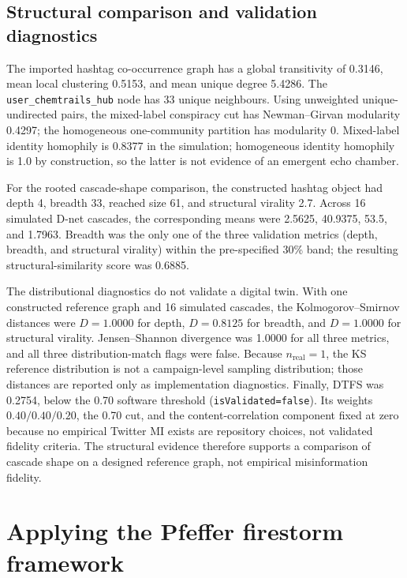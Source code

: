 \subsection{Structural comparison and validation diagnostics}

The imported hashtag co-occurrence graph has a global transitivity of 0.3146, mean local clustering
0.5153, and mean unique degree 5.4286.  The
\texttt{user\_chemtrails\_hub} node has 33 unique neighbours.  Using
unweighted unique-undirected pairs, the mixed-label conspiracy cut has
Newman--Girvan modularity 0.4297; the homogeneous one-community partition
has modularity 0.  Mixed-label identity homophily is 0.8377
in the simulation; homogeneous identity homophily is 1.0 by construction,
so the latter is not evidence of an emergent echo chamber.

For the rooted cascade-shape comparison, the constructed hashtag object had depth
4, breadth 33, reached size 61, and structural virality 2.7.  Across 16
simulated D-net cascades, the corresponding means were 2.5625, 40.9375,
53.5, and 1.7963.  Breadth was the only one of the three validation metrics
(depth, breadth, and structural virality) within the pre-specified
30\% band; the resulting structural-similarity score was 0.6885.

The distributional diagnostics do not validate a digital twin.
With one constructed reference graph and 16 simulated cascades, the
Kolmogorov--Smirnov distances were \(D=1.0000\) for depth,
\(D=0.8125\) for breadth, and \(D=1.0000\) for structural virality.
Jensen--Shannon divergence was 1.0000 for all three metrics, and all three
distribution-match flags were false. Because \(n_{\mathrm{real}}=1\), the KS
reference distribution is not a campaign-level sampling distribution; those
distances are reported only as implementation diagnostics. Finally, DTFS
was 0.2754, below the 0.70 software threshold
(\texttt{isValidated=false}). Its weights \(0.40/0.40/0.20\), the 0.70 cut,
and the content-correlation component fixed at zero because no empirical
Twitter MI exists are repository choices, not validated fidelity criteria.
The structural evidence therefore supports a comparison of cascade shape on
a designed reference graph, not empirical misinformation fidelity.


\section{Applying the Pfeffer firestorm framework}
\label{sec:pfeffer-application}

